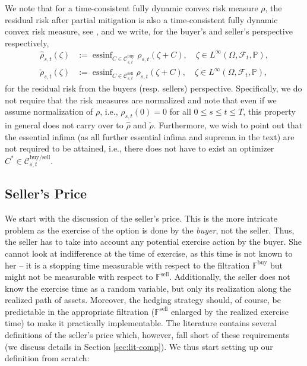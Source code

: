 \documentclass{article}
\DeclareMathOperator*{\essinf}{ess inf}
\newcommand{\loftp}{L^\infty(\Omega,\mathcal{F}_t,  \mathbb{P})}
\begin{document}
We note that for a time-consistent fully dynamic convex risk measure $\rho$, the residual risk after partial mitigation is also a time-consistent fully dynamic convex risk measure, see \cite[Section 4]{KS05}, and we write, for the buyer's and seller's perspective respectively,
\begin{align*}
	\hat{\rho}_{s,t}(\zeta) &:= \essinf_{C \in \mathcal{C}^\text{buy}_{s,t}} \rho_{s,t} (\zeta + C), \quad \zeta \in \loftp,\\
	\check{\rho}_{s,t}(\zeta) &:= \essinf_{C \in \mathcal{C}^\text{sell}_{s,t}} \rho_{s,t} (\zeta + C), \quad \zeta \in \loftp,
\end{align*}
for the residual risk from the buyers (resp. sellers) perspective. Specifically, we do not require that the risk measures are normalized and note that even if we assume normalization of $\rho$, i.e., $\rho_{s,t}(0)=0$ for all $0 \leq s\leq t \leq T$, this property in general does not carry over to $\hat{\rho}$ and $\check{\rho}$. Furthermore, we wish to point out that the essential infima (as all further essential infima and suprema in the text) are not required to be attained, i.e., there does not have to exist an optimizer $C^* \in \mathcal{C}^\text{buy/sell}_{s,t}$. 



\subsection{Seller's Price}\label{sec:sell}

We start with the discussion of the seller's price. This is the more intricate problem as the exercise of the option is done by the \textit{buyer}, not the seller. Thus, the seller has to take into account any potential exercise action by the buyer. She cannot look at indifference at the time of exercise, as this time is not known to her -- it is a stopping time measurable with respect to the filtration $\mathbb{F}^\text{buy}$ but might not be measurable with respect to $\mathbb{F}^\text{sell}$. Additionally, the seller does not know the exercise time as a random variable, but only its realization along the realized path of assets. Moreover, the hedging strategy should, of course, be predictable in the appropriate filtration ($\mathbb{F}^\text{sell}$ enlarged by the realized exercise time) to make it practically implementable. The literature contains several definitions of the seller's price which, however, fall short of these requirements (we discuss details in Section \ref{sec:lit-comp}). We thus start setting up our definition from scratch:
\end{document}
